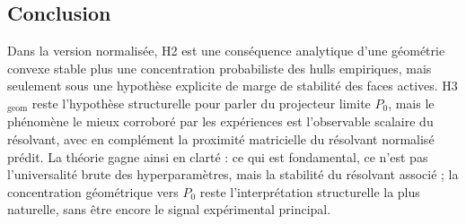 \subsection{Conclusion}

Dans la version normalisée, H2 est une conséquence analytique d'une géométrie convexe stable plus une concentration probabiliste des hulls empiriques, mais seulement sous une hypothèse explicite de marge de stabilité des faces actives.
H3\(_{\mathrm{geom}}\) reste l'hypothèse structurelle pour parler du projecteur limite \(P_0\), mais le phénomène le mieux corroboré par les expériences est l'observable scalaire du résolvant, avec en complément la proximité matricielle du résolvant normalisé prédit.
La théorie gagne ainsi en clarté : ce qui est fondamental, ce n'est pas l'universalité brute des hyperparamètres, mais la stabilité du résolvant associé ; la concentration géométrique vers \(P_0\) reste l'interprétation structurelle la plus naturelle, sans être encore le signal expérimental principal.

























